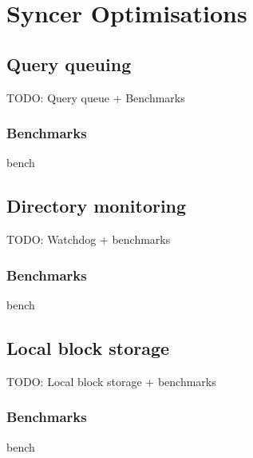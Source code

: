 
\chapter{Syncer Optimisations}


\section{Query queuing}
  TODO: Query queue + Benchmarks
  \subsection{Benchmarks}
  bench

\section{Directory monitoring}
  TODO: Watchdog + benchmarks
  \subsection{Benchmarks}
  bench

\section{Local block storage}
  TODO: Local block storage + benchmarks
  \subsection{Benchmarks}
  bench
